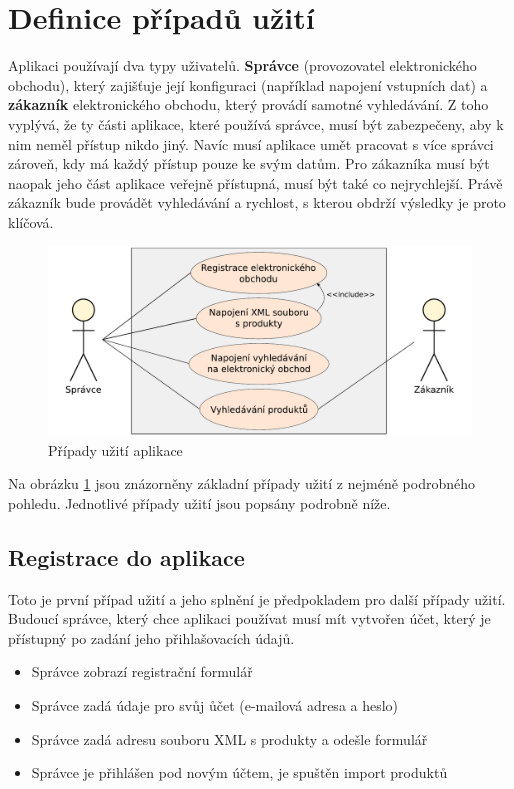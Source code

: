 \documentclass[FM,DP]{tulthesis}
\begin{document}
\section{Definice případů užití}

Aplikaci používají dva typy uživatelů. \textbf{Správce} (provozovatel elektronického obchodu), který
zajišťuje její konfiguraci (například napojení vstupních dat) a \textbf{zákazník} elektronického
obchodu, který provádí samotné vyhledávání. Z toho vyplývá, že ty části aplikace, které používá 
správce, musí být zabezpečeny, aby k nim neměl přístup nikdo jiný. Navíc musí aplikace umět
pracovat s více správci zároveň, kdy má každý přístup pouze ke svým datům. Pro zákazníka
musí být naopak jeho část aplikace veřejně přístupná, musí být také co nejrychlejší. 
Právě zákazník bude provádět vyhledávání a rychlost, s kterou obdrží výsledky je proto
klíčová.

\begin{figure}[h]
\center
\includegraphics[width=\textwidth]{use-case.pdf}
\caption{Případy užití aplikace}
\label{use-case}
\end{figure}

Na obrázku \ref{use-case} jsou znázorněny základní případy užití z nejméně podrobného pohledu. Jednotlivé 
případy užití jsou popsány podrobně níže.

\subsection{Registrace do aplikace}

Toto je první případ užití a jeho splnění je předpokladem pro další případy užití. Budoucí
správce, který chce aplikaci používat musí mít vytvořen účet, který je přístupný po zadání
jeho přihlašovacích údajů.

\begin{itemize}
\item Správce zobrazí registrační formulář
\item Správce zadá údaje pro svůj ůčet (e-mailová adresa a heslo)
\item Správce zadá adresu souboru XML s produkty a odešle formulář
\item Správce je přihlášen pod novým účtem, je spuštěn import produktů
\end{itemize}
\end{document}
